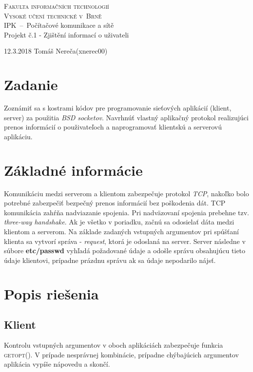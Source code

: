 \documentclass[a4paper, 11pt]{article}
\begin{document}
\begin{titlepage}
\begin{center}
	
	\textsc{\Huge Fakulta informačních technologií\\[3.5mm]
			Vysoké učení technické v~Brně}
	\\[79mm]
	{\LARGE IPK \,--\, Počítačové komunikace a sítě\\[1.5mm]
	Projekt č.1 - Zjištění informací o uživateli}
	\vfill
\end{center}
{\Large 12.3.2018 \hfill Tomáš Nereča(xnerec00)}
\\[-4mm]
\end{titlepage}
\tableofcontents
\thispagestyle{empty}
\newpage

\section{Zadanie}
Zoznámiť sa s kostrami kódov pre programovanie sieťových aplikácií (klient, server) za použitia \emph{BSD socketov}. Navrhnúť vlastný aplikačný protokol realizujúci prenos informácií o použivateľoch a naprogramovať klientskú a serverovú aplikáciu.

\section{Základné informácie}
Komunikáciu medzi serverom a klientom zabezpečuje protokol \emph{TCP}, nakoľko bolo potrebné zabezpečiť bezpečný prenos informácií bez poškodenia dát. TCP komunikácia zahŕňa nadviazanie spojenia. Pri nadväzovaní spojenia prebehne tzv. \emph{three-way handshake}. Ak je všetko v poriadku, začnú sa odosielať dáta medzi klientom a serverom. Na základe zadaných vstupných argumentov pri spúšťaní klienta sa vytvorí správa - \emph{request}, ktorá je odoslaná na server. Server následne v súbore \textbf{etc/passwd} vyhľadá požadované údaje a odošle správu obsahujúcu tieto údaje klientovi, prípadne prázdnu správu ak sa údaje nepodarilo nájsť.

\section{Popis riešenia}

\subsection{Klient}
Kontrolu vstupných argumentov v oboch aplikáciách zabezpečuje funkcia \textsc{getopt()}. V prípade nesprávnej kombinácie, prípadne chýbajúcich argumentov aplikácia vypíše nápovedu a skončí.
\end{document}
